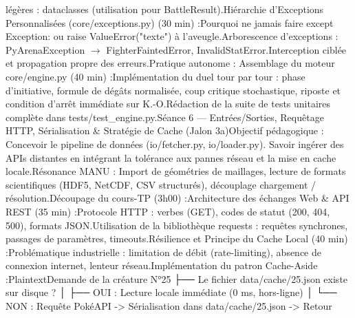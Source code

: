 légères : dataclasses (utilisation pour BattleResult).Hiérarchie d'Exceptions Personnalisées (core/exceptions.py) (30 min) :Pourquoi ne jamais faire except Exception: ou raise ValueError("texte") à l'aveugle.Arborescence d'exceptions : PyArenaException $\rightarrow$ FighterFaintedError, InvalidStatError.Interception ciblée et propagation propre des erreurs.Pratique autonome : Assemblage du moteur core/engine.py (40 min) :Implémentation du duel tour par tour : phase d'initiative, formule de dégâts normalisée, coup critique stochastique, riposte et condition d'arrêt immédiate sur K.-O.Rédaction de la suite de tests unitaires complète dans tests/test_engine.py.Séance 6 — Entrées/Sorties, Requêtage HTTP, Sérialisation & Stratégie de Cache (Jalon 3a)Objectif pédagogique : Concevoir le pipeline de données (io/fetcher.py, io/loader.py). Savoir ingérer des APIs distantes en intégrant la tolérance aux pannes réseau et la mise en cache locale.Résonance MANU : Import de géométries de maillages, lecture de formats scientifiques (HDF5, NetCDF, CSV structurés), découplage chargement / résolution.Découpage du cours-TP (3h00) :Architecture des échanges Web & API REST (35 min) :Protocole HTTP : verbes (GET), codes de statut (200, 404, 500), formats JSON.Utilisation de la bibliothèque requests : requêtes synchrones, passages de paramètres, timeouts.Résilience et Principe du Cache Local (40 min) :Problématique industrielle : limitation de débit (rate-limiting), absence de connexion internet, lenteur réseau.Implémentation du patron Cache-Aside :PlaintextDemande de la créature N°25
   ├── Le fichier data/cache/25.json existe sur disque ?
   │     ├── OUI : Lecture locale immédiate (0 ms, hors-ligne)
   │     └── NON : Requête PokéAPI -> Sérialisation dans data/cache/25.json -> Retour

